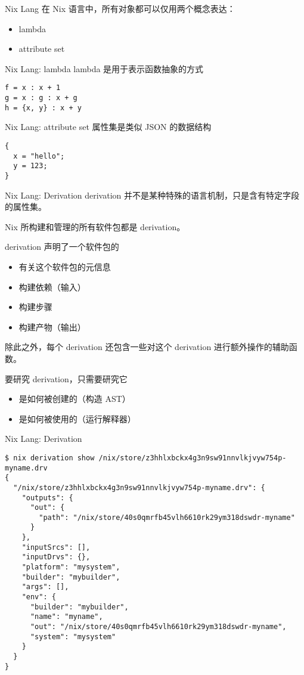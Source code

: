 \documentclass{beamer}
\begin{document}
\begin{frame}{Nix Lang}
在 Nix 语言中，所有对象都可以仅用两个概念表达：
\begin{itemize}
\item lambda
\item attribute set
\end{itemize}
\end{frame}

\begin{frame}[fragile]{Nix Lang: lambda}
lambda 是用于表示函数抽象的方式
\begin{verbatim}
f = x : x + 1
g = x : g : x + g
h = {x, y} : x + y
\end{verbatim}
\end{frame}

\begin{frame}[fragile]{Nix Lang: attribute set}
属性集是类似 JSON 的数据结构
\begin{verbatim}
{
  x = "hello";
  y = 123;
}
\end{verbatim}
\end{frame}

\begin{frame}[fragile]{Nix Lang: Derivation}
derivation 并不是某种特殊的语言机制，只是含有特定字段的属性集。

Nix 所构建和管理的所有软件包都是 derivation。

derivation 声明了一个软件包的

\begin{itemize}
  \item 有关这个软件包的元信息
  \item 构建依赖（输入）
  \item 构建步骤
  \item 构建产物（输出）
\end{itemize}

除此之外，每个 derivation 还包含一些对这个 derivation 进行额外操作的辅助函数。

要研究 derivation，只需要研究它

\begin{itemize}
  \item 是如何被创建的（构造 AST）
  \item 是如何被使用的（运行解释器）
\end{itemize}

\end{frame}

\begin{frame}[fragile]{Nix Lang: Derivation}
\begin{verbatim}
$ nix derivation show /nix/store/z3hhlxbckx4g3n9sw91nnvlkjvyw754p-myname.drv
{
  "/nix/store/z3hhlxbckx4g3n9sw91nnvlkjvyw754p-myname.drv": {
    "outputs": {
      "out": {
        "path": "/nix/store/40s0qmrfb45vlh6610rk29ym318dswdr-myname"
      }
    },
    "inputSrcs": [],
    "inputDrvs": {},
    "platform": "mysystem",
    "builder": "mybuilder",
    "args": [],
    "env": {
      "builder": "mybuilder",
      "name": "myname",
      "out": "/nix/store/40s0qmrfb45vlh6610rk29ym318dswdr-myname",
      "system": "mysystem"
    }
  }
}
\end{verbatim}
\end{frame}
\end{document}
